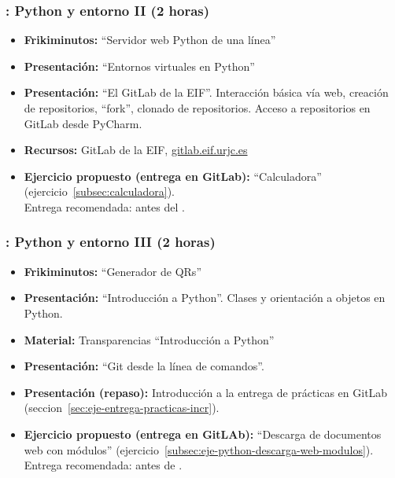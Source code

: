 \documentclass[a4paper,12pt]{article}
\begin{document}
\subsubsection{\martesB: Python y entorno II  (2 horas)}
\label{cal:martesB}

\begin{itemize}
\item \textbf{Frikiminutos:} ``Servidor web Python de una línea''
\item \textbf{Presentación:} ``Entornos virtuales en Python''
\item \textbf{Presentación:} ``El GitLab de la EIF''. Interacción básica vía web, creación de repositorios, ``fork'', clonado de repositorios. Acceso a repositorios en GitLab desde PyCharm.
\item \textbf{Recursos:} GitLab de la EIF, \url{gitlab.eif.urjc.es}
\item \textbf{Ejercicio propuesto (entrega en GitLab):} ``Calculadora'' (ejercicio~\ref{subsec:calculadora}). \\
  Entrega recomendada: antes del \martesC.
\end{itemize}

\subsubsection{\martesC: Python y entorno III  (2 horas)}
\label{cal:martesC}

\begin{itemize}
\item \textbf{Frikiminutos:} ``Generador de QRs''
\item \textbf{Presentación:} ``Introducción a Python''. Clases y orientación a objetos en Python.
\item \textbf{Material:} Transparencias ``Introducción a Python''
\item \textbf{Presentación:} ``Git desde la línea de comandos''.
\item \textbf{Presentación (repaso):} Introducción a la entrega de prácticas en GitLab (seccion~\ref{sec:eje-entrega-practicas-incr}).
\item \textbf{Ejercicio propuesto (entrega en GitLAb):} ``Descarga de documentos web con módulos'' (ejercicio~\ref{subsec:eje-python-descarga-web-modulos}). \\
Entrega recomendada: antes de \martesD.
\end{itemize}
\end{document}
